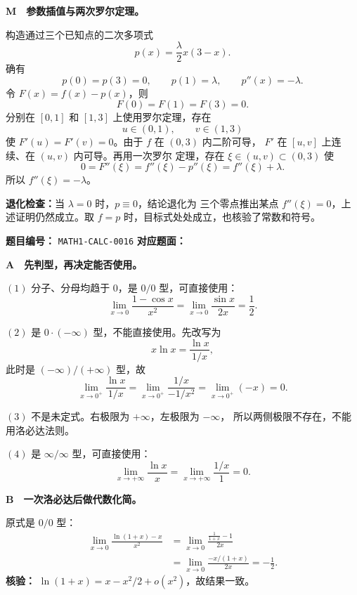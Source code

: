 \begin{solutionBox}
\textbf{M　参数插值与两次罗尔定理。}

构造通过三个已知点的二次多项式
\[
p(x)=\frac{\lambda}{2}x(3-x).
\]
确有
\[
p(0)=p(3)=0,\qquad p(1)=\lambda,\qquad p''(x)=-\lambda.
\]
令 \(F(x)=f(x)-p(x)\)，则
\[
F(0)=F(1)=F(3)=0.
\]
分别在 \([0,1]\) 和 \([1,3]\) 上使用罗尔定理，存在
\[
u\in(0,1),\qquad v\in(1,3)
\]
使 \(F'(u)=F'(v)=0\)。由于 \(f\) 在 \((0,3)\) 内二阶可导，
\(F'\) 在 \([u,v]\) 上连续、在 \((u,v)\) 内可导。再用一次罗尔
定理，存在 \(\xi\in(u,v)\subset(0,3)\) 使
\[
0=F''(\xi)=f''(\xi)-p''(\xi)=f''(\xi)+\lambda.
\]
所以 \(f''(\xi)=-\lambda\)。

\textbf{退化检查：}当 \(\lambda=0\) 时，\(p\equiv0\)，结论退化为
三个零点推出某点 \(f''(\xi)=0\)，上述证明仍然成立。取 \(f=p\)
时，目标式处处成立，也核验了常数和符号。
\end{solutionBox}

\begin{problemMeta}
\textbf{题目编号：} \texttt{MATH1-CALC-0016}\quad
\textbf{对应题面：} 
\end{problemMeta}

\begin{solutionBox}
\textbf{A　先判型，再决定能否使用。}

\((1)\) 分子、分母均趋于 \(0\)，是 \(0/0\) 型，可直接使用：
\[
\lim_{x\to0}\frac{1-\cos x}{x^2}
=\lim_{x\to0}\frac{\sin x}{2x}
=\frac12.
\]

\((2)\) 是 \(0\cdot(-\infty)\) 型，不能直接使用。先改写为
\[
x\ln x=\frac{\ln x}{1/x},
\]
此时是 \((-\infty)/(+\infty)\) 型，故
\[
\lim_{x\to0^+}\frac{\ln x}{1/x}
=\lim_{x\to0^+}\frac{1/x}{-1/x^2}
=\lim_{x\to0^+}(-x)=0.
\]

\((3)\) 不是未定式。右极限为 \(+\infty\)，左极限为 \(-\infty\)，
所以两侧极限不存在，不能用洛必达法则。

\((4)\) 是 \(\infty/\infty\) 型，可直接使用：
\[
\lim_{x\to+\infty}\frac{\ln x}{x}
=\lim_{x\to+\infty}\frac{1/x}{1}=0.
\]
\end{solutionBox}

\begin{solutionBox}
\textbf{B　一次洛必达后做代数化简。}

原式是 \(0/0\) 型：
\[
\begin{aligned}
\lim_{x\to0}\frac{\ln(1+x)-x}{x^2}
&=\lim_{x\to0}\frac{\frac1{1+x}-1}{2x}\\
&=\lim_{x\to0}\frac{-x/(1+x)}{2x}
=-\frac12.
\end{aligned}
\]
\textbf{核验：}
\(\ln(1+x)=x-x^2/2+o(x^2)\)，故结果一致。
\end{solutionBox}

